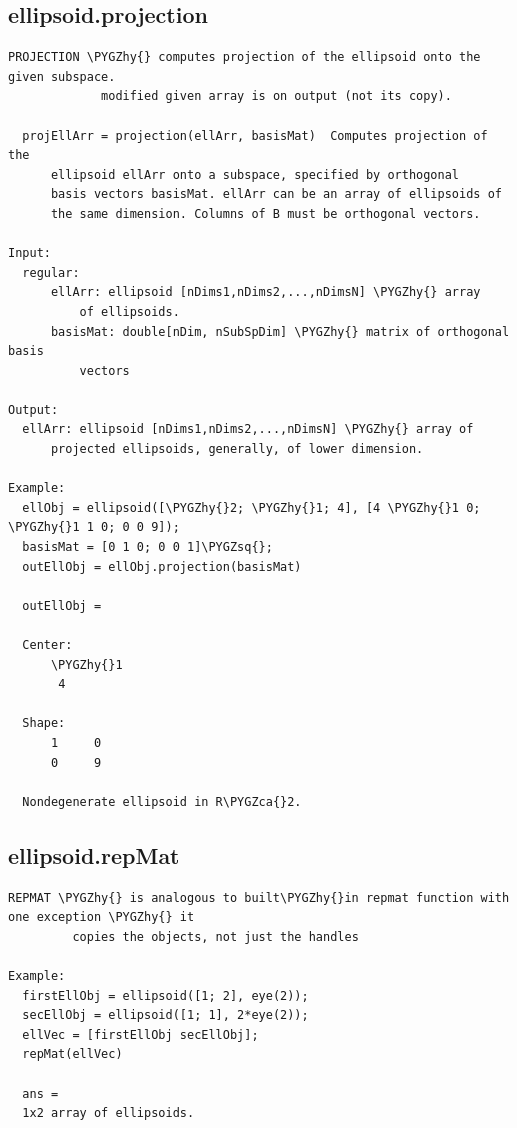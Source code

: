 \documentclass[letterpaper,10pt,english]{sphinxmanual}
\def\PYGZca{\char`\^}
\def\PYGZhy{\char`\-}
\def\PYGZsq{\char`\'}
\begin{document}
\subsection{ellipsoid.projection}
\label{chap_functions:ellipsoid-projection}
\begin{Verbatim}[commandchars=\\\{\}]
PROJECTION \PYGZhy{} computes projection of the ellipsoid onto the given subspace.
             modified given array is on output (not its copy).

  projEllArr = projection(ellArr, basisMat)  Computes projection of the
      ellipsoid ellArr onto a subspace, specified by orthogonal
      basis vectors basisMat. ellArr can be an array of ellipsoids of
      the same dimension. Columns of B must be orthogonal vectors.

Input:
  regular:
      ellArr: ellipsoid [nDims1,nDims2,...,nDimsN] \PYGZhy{} array
          of ellipsoids.
      basisMat: double[nDim, nSubSpDim] \PYGZhy{} matrix of orthogonal basis
          vectors

Output:
  ellArr: ellipsoid [nDims1,nDims2,...,nDimsN] \PYGZhy{} array of
      projected ellipsoids, generally, of lower dimension.

Example:
  ellObj = ellipsoid([\PYGZhy{}2; \PYGZhy{}1; 4], [4 \PYGZhy{}1 0; \PYGZhy{}1 1 0; 0 0 9]);
  basisMat = [0 1 0; 0 0 1]\PYGZsq{};
  outEllObj = ellObj.projection(basisMat)

  outEllObj =

  Center:
      \PYGZhy{}1
       4

  Shape:
      1     0
      0     9

  Nondegenerate ellipsoid in R\PYGZca{}2.
\end{Verbatim}


\subsection{ellipsoid.repMat}
\label{chap_functions:ellipsoid-repmat}
\begin{Verbatim}[commandchars=\\\{\}]
REPMAT \PYGZhy{} is analogous to built\PYGZhy{}in repmat function with one exception \PYGZhy{} it
         copies the objects, not just the handles

Example:
  firstEllObj = ellipsoid([1; 2], eye(2));
  secEllObj = ellipsoid([1; 1], 2*eye(2));
  ellVec = [firstEllObj secEllObj];
  repMat(ellVec)

  ans =
  1x2 array of ellipsoids.
\end{Verbatim}
\end{document}
